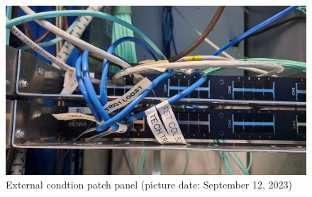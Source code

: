 \begin{figure}[htb]
\centering
\includegraphics[width=15cm]{figures/ext_cond_pp}
\caption{External condtion patch panel (picture date: September 12, 2023)}
\label{fig:appl:ext_cond_pp}
\end{figure}

\clearpage

